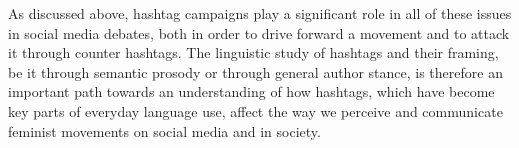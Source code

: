 \documentclass[output=paper,english,spanish,german,english]{langsci/langscibook}
\begin{document}
As discussed above, hashtag campaigns play a significant role in all of these issues in social media debates, both in order to drive forward a movement and to attack it through counter hashtags. The linguistic study of hashtags and their framing, be it through semantic prosody or through general author stance, is therefore an important path towards an understanding of how hashtags, which have become key parts of everyday language use, affect the way we perceive and communicate feminist movements on social media and in society.

{\sloppy\printbibliography[heading=subbibliography,notkeyword=this]}
\end{document}
